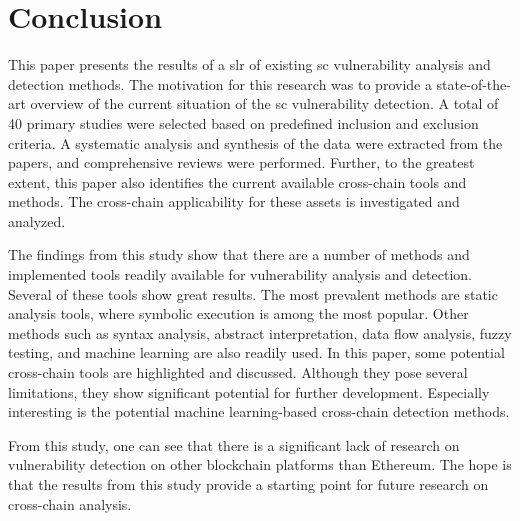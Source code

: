 \chapter{Conclusion}
\label{chap:conclusion}

This paper presents the results of a \acrlong{slr} of existing \acrlong{sc} vulnerability analysis and detection methods. The motivation for this research was to provide a state-of-the-art overview of the current situation of the \acrshort{sc} vulnerability detection. A total of 40 primary studies were selected based on predefined inclusion and exclusion criteria. A systematic analysis and synthesis of the data were extracted from the papers, and comprehensive reviews were performed. Further, to the greatest extent, this paper also identifies the current available cross-chain tools and methods. The cross-chain applicability for these assets is investigated and analyzed.

The findings from this study show that there are a number of methods and implemented tools readily available for vulnerability analysis and detection. Several of these tools show great results. The most prevalent methods are static analysis tools, where symbolic execution is among the most popular. Other methods such as syntax analysis, abstract interpretation, data flow analysis, fuzzy testing, and machine learning are also readily used. In this paper, some potential cross-chain tools are highlighted and discussed. Although they pose several limitations, they show significant potential for further development. Especially interesting is the potential machine learning-based cross-chain detection methods.

From this study, one can see that there is a significant lack of research on vulnerability detection on other blockchain platforms than Ethereum. The hope is that the results from this study provide a starting point for future research on cross-chain analysis.
